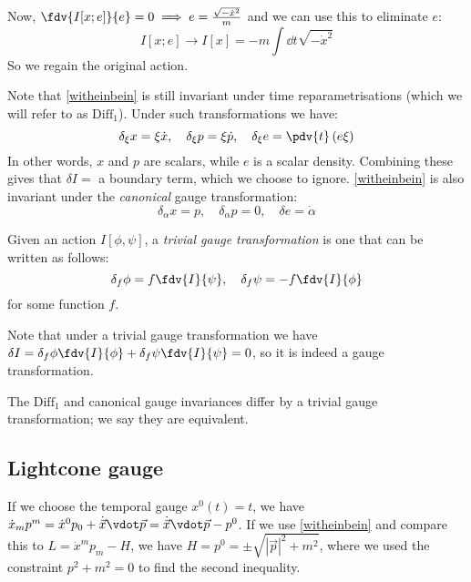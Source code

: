 \documentclass{jknotes}
\begin{document}
Now, \(\fdv{I[x;e]}{e} = 0 \implies e = \frac{\sqrt{-\dot{x}^2}}{m}\) and we can use this to eliminate \(e\):
\begin{equation}
    I[x;e] \rightarrow I[x] = -m\int\dd{t}\sqrt{-\dot{x}^2}
\end{equation}
So we regain the original action.

Note that \eqref{witheinbein} is still invariant under time reparametrisations (which we will refer to as \(\text{Diff}_1\)). Under such transformations we have:
\begin{equation}
    \delta_\xi x = \xi \dot{x},\quad \delta_\xi p = \xi \dot{p},\quad \delta_\xi e = \pdv{t}\left( e\xi \right)
\end{equation}
In other words, \(x\) and \(p\) are scalars, while \(e\) is a scalar density. Combining these gives that \(\delta I = \) a boundary term, which we choose to ignore. \eqref{witheinbein} is also invariant under the \emph{canonical} gauge transformation:
\begin{equation}
    \delta_\alpha x = p,\quad \delta_\alpha p = 0, \quad \delta e = \dot{\alpha}
\end{equation}

\begin{defn}
    Given an action \(I[\phi,\psi]\), a \emph{trivial gauge transformation} is one that can be written as follows:
    \begin{equation}
        \delta_f\phi = f \fdv{I}{\psi},\quad \delta_f\psi = -f \fdv{I}{\phi}
    \end{equation}
    for some function \(f\).
\end{defn}
Note that under a trivial gauge transformation we have \(\delta I = \delta_f\phi \fdv{I}{\phi} + \delta_f\psi\fdv{I}{\psi} = 0\), so it is indeed a gauge transformation.

The \(\text{Diff}_1\) and canonical gauge invariances differ by a trivial gauge transformation; we say they are equivalent.

\subsection{Lightcone gauge}

If we choose the temporal gauge \(x^0(t)=t\), we have \(\dot{x}_mp^m=\dot{x}^0p_0 + \dot{\vec{x}}\vdot\vec{p} = \dot{\vec{x}}\vdot\vec{p}-p^0\). If we use \eqref{witheinbein} and compare this to \(L = \dot{x}^mp_m - H\), we have \(H = p^0 = \pm\sqrt{|\vec{p}|^2+m^2}\), where we used the constraint \(p^2+m^2=0\) to find the second inequality.
\end{document}

